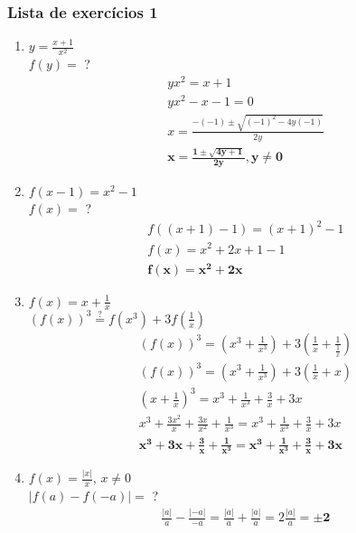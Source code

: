 \documentclass{article}
\begin{document}
\subsubsection*{Lista de exercícios 1}
\begin{enumerate}\bfseries
    \item $y = \frac{x+1}{x^2}$ \\
    $f(y)=$ ?
        \begin{gather*}
            yx^2 = x + 1 \\
            yx^2 - x - 1 = 0 \\
            x = \frac{-(-1) \pm \sqrt{(-1)^2 - 4y(-1)}}{2y} \\
            \mathbf{x = \frac{1 \pm \sqrt{4y + 1}}{2y}, y \neq 0}
        \end{gather*}

    \item $f(x-1) = x^2 - 1$ \\
    $f(x)=$ ?
        \begin{gather*}
            f((x + 1) - 1) = (x + 1)^2 - 1 \\
            f(x) = x^2 + 2x + 1 - 1 \\
            \mathbf{f(x) = x^2 + 2x}
        \end{gather*}

    \item $f(x) = x + \frac{1}{x}$ \\
    $(f(x))^3 \stackrel{?}{=} f(x^3) + 3f(\frac{1}{x})$
        \begin{gather*}
            (f(x))^3 = (x^3 + \frac{1}{x^3}) + 3({\frac{1}{x}} +
            \frac{1}{\frac{1}{x}}) \\
            (f(x))^3 = (x^3 + \frac{1}{x^3}) + 3(\frac{1}{x} + x) \\
            (x + \frac{1}{x})^3 = x^3 + \frac{1}{x^3} + {\frac{3}{x} + 3x} \\
            x^3 + \frac{3x^2}{x} + \frac{3x}{x^2} + \frac{1}{x^3} = x^3 +
            \frac{1}{x^3} + {\frac{3}{x} + 3x} \\
           \mathbf{x^3 + 3x + \frac{3}{x} + \frac{1}{x^3} = x^3 + \frac{1}{x^3}
           + {\frac{3}{x}} + 3x}
        \end{gather*}

    \item $f(x) = \frac{|x|}{x}$, $x \neq 0$ \\
    $|f(a) - f(-a)| =$ ?
        \begin{gather*}
            \frac{|a|}{a} - \frac{|-a|}{-a} =
            \frac{|a|}{a} + \frac{|a|}{a} = 2\frac{|a|}{a} = \mathbf{\pm2}
        \end{gather*}


\end{enumerate}
\end{document}
